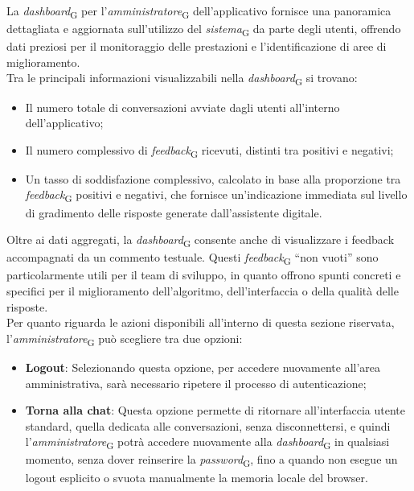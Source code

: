 La \textit{dashboard}\textsubscript{G} per l'\textit{amministratore}\textsubscript{G} dell’applicativo fornisce una panoramica dettagliata e aggiornata sull’utilizzo del \textit{sistema}\textsubscript{G} da parte degli utenti, offrendo dati preziosi per il monitoraggio delle prestazioni e l’identificazione di aree di miglioramento. \\
Tra le principali informazioni visualizzabili nella \textit{dashboard}\textsubscript{G} si trovano:
\begin{itemize}
    \item Il numero totale di conversazioni avviate dagli utenti all’interno dell’applicativo;
    \item Il numero complessivo di \textit{feedback}\textsubscript{G} ricevuti, distinti tra positivi e negativi;
    \item Un tasso di soddisfazione complessivo, calcolato in base alla proporzione tra \textit{feedback}\textsubscript{G} positivi e negativi, che fornisce un’indicazione immediata sul livello di gradimento delle risposte generate dall’assistente digitale.
\end{itemize}
Oltre ai dati aggregati, la \textit{dashboard}\textsubscript{G} consente anche di visualizzare i feedback accompagnati da un commento testuale. Questi \textit{feedback}\textsubscript{G} “non vuoti” sono particolarmente utili per il team di sviluppo, in quanto offrono spunti concreti e specifici per il miglioramento dell’algoritmo, dell’interfaccia o della qualità delle risposte. \\
Per quanto riguarda le azioni disponibili all’interno di questa sezione riservata, l’\textit{amministratore}\textsubscript{G} può scegliere tra due opzioni:
\begin{itemize}
    \item \textbf{Logout}: Selezionando questa opzione, per accedere nuovamente all’area amministrativa, sarà necessario ripetere il processo di autenticazione;
    \item \textbf{Torna alla chat}: Questa opzione permette di ritornare all’interfaccia utente standard, quella dedicata alle conversazioni, senza disconnettersi, e quindi l’\textit{amministratore}\textsubscript{G} potrà accedere nuovamente alla \textit{dashboard}\textsubscript{G} in qualsiasi momento, senza dover reinserire la \textit{password}\textsubscript{G}, fino a quando non esegue un logout esplicito o svuota manualmente la memoria locale del browser.
\end{itemize}
